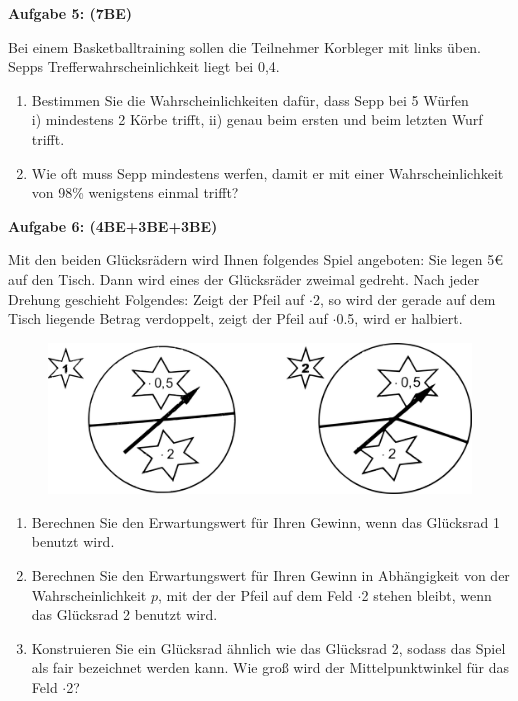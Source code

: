 \documentclass[a4paper,12pt]{article}
\newcommand{\Aufgabe}[1]{
  {
  \vspace*{0.5cm}
  \textsf{\textbf{Aufgabe #1}}
  \vspace*{0.2cm}
  
  }
}
\begin{document}
\Aufgabe{5: (7BE)} 
Bei einem Basketballtraining sollen die Teilnehmer Korbleger mit links üben. Sepps Trefferwahrscheinlichkeit liegt bei 0,4.
\begin{enumerate}[label={\alph*)}] 
  \item Bestimmen Sie die Wahrscheinlichkeiten dafür, dass Sepp bei 5 Würfen\\
    i) mindestens 2 Körbe trifft,  ii) genau beim ersten und beim letzten Wurf trifft.
  \item Wie oft muss Sepp mindestens werfen, damit er mit einer Wahrscheinlichkeit von 98\% wenigstens einmal trifft?
\end{enumerate}

\Aufgabe{6: (4BE+3BE+3BE)} 
Mit den beiden Glücksrädern wird Ihnen folgendes Spiel angeboten: Sie legen 5€ auf den Tisch. Dann wird eines der Glücksräder zweimal gedreht. Nach jeder Drehung geschieht Folgendes: Zeigt der Pfeil auf $\cdot$2, so wird der gerade auf dem Tisch liegende Betrag verdoppelt, zeigt der Pfeil auf $\cdot$0.5, wird er halbiert.

\begin{figure}[H]
  \centering
  \includegraphics[width=0.7\columnwidth]{211203_gluecksraeder.png}
\end{figure}

\begin{enumerate}[label={\alph*)}] 
  \item Berechnen Sie den Erwartungswert für Ihren Gewinn, wenn das Glücksrad 1 benutzt wird.
  \item Berechnen Sie den Erwartungswert für Ihren Gewinn in Abhängigkeit von der Wahrscheinlichkeit $p$, mit der der Pfeil auf dem Feld $\cdot$2 stehen bleibt, wenn das Glücksrad 2 benutzt wird.
  \item Konstruieren Sie ein Glücksrad ähnlich wie das Glücksrad 2, sodass das Spiel als fair bezeichnet werden kann. Wie groß wird der Mittelpunktwinkel für das Feld $\cdot$2?
\end{enumerate}
\end{document}
